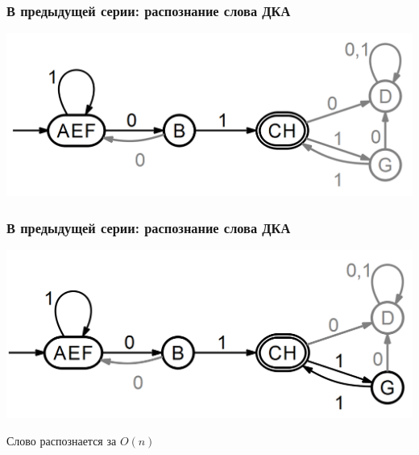 \documentclass{beamer}
\begin{document}
\begin{frame}[fragile]
  \transwipe[direction=90]
  \frametitle{В предыдущей серии: распознание слова ДКА}
  \begin{center}
  \includegraphics[width=\textwidth]{pics/path2.png}  
  \end{center}
\end{frame}

\begin{frame}[fragile]
  \transwipe[direction=90]
  \frametitle{В предыдущей серии: распознание слова ДКА}
  \begin{center}
  \includegraphics[width=\textwidth]{pics/path3.png}  
  \end{center}

  Слово распознается за $O(n)$
\end{frame}
\end{document}
